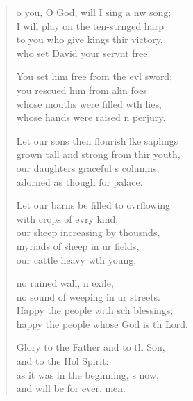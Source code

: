 \begin{verse}
  \begin{patverse}
o you, O God, will I sing a nw song;\Med\\
I will play on the ten-str\pointup{\i}nged harp\\
to you who give kings thir victory,\Med\\
who set David your servnt free.

You set him free from the ev\pointup{\i}l sword;\Med\\
you rescued him from alin foes\\
whose mouths were filled w\pointup{\i}th lies,\Med\\
whose hands were raised \pointup{\i}n perjury.

Let our sons then flourish l\pointup{\i}ke saplings\Med\\
grown tall and strong from thir youth,\\
our daughters graceful s columns,\Med\\
adorned as though for  palace.

Let our barns be filled to ovrflowing\Med\\
with crops of evry kind;\\
our sheep increasing by thousnds,\Flex\\
myriads of sheep in ur fields,\Med\\
our cattle heavy w\pointup{\i}th young,

no ruined wall, n exile,\Med\\
no sound of weeping in ur streets.\\
Happy the people with sch blessings;\Med\\
happy the people whose God is th Lord.

Glory to the Father and to th Son,\Med\\
and to the Hol Spirit:\\
as it was in the beginning, \pointup{\i}s now,\Med\\
and will be for ever. men.
  \end{patverse}
\end{verse}
